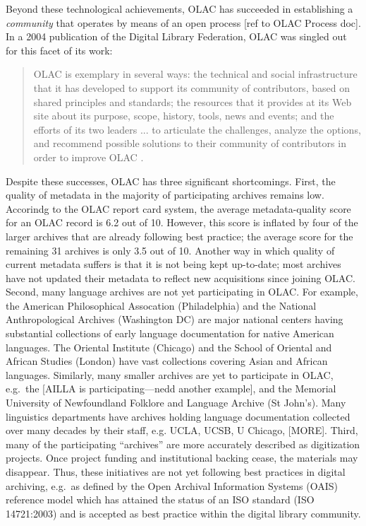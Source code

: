Beyond these technological achievements, OLAC has succeeded in
establishing a \emph{community} that operates by means of an open
process [ref to OLAC Process doc].  In a 2004 publication of the
Digital Library Federation, OLAC was singled out for this
facet of its work:

\begin{quote} \small
  OLAC is exemplary in several ways: the technical and social
  infrastructure that it has developed to support its community of
  contributors, based on shared principles and standards; the
  resources that it provides at its Web site about its purpose, scope,
  history, tools, news and events; and the efforts of its two leaders
  ... to articulate the challenges, analyze the options, and recommend
  possible solutions to their community of contributors in order to
  improve OLAC \citep{Brogan04}.
\end{quote}


Despite these successes, OLAC has three significant shortcomings.
First, the quality of metadata in the majority of participating archives remains
low.  Accorindg to the OLAC report card system, the average 
metadata-quality score for an OLAC record is 6.2 out of 10. However,
this score is
inflated by four of the larger archives that are already
following best practice; the average score for the remaining 31 archives
is only 3.5 out of 10.  Another way in which quality of current metadata suffers is that it is not being kept up-to-date; most archives have not
updated their metadata to reflect new acquisitions since joining OLAC.
Second, many language archives are not yet participating in OLAC.  For
example, the American Philosophical Assocation (Philadelphia) and the
National Anthropological Archives (Washington DC) are major national
centers having substantial collections of early language documentation
for native American languages.  The Oriental Institute (Chicago) and
the School of Oriental and African Studies (London) have vast
collections covering Asian and African languages.  Similarly, many
smaller archives are yet to participate in OLAC, e.g.\ the
[AILLA is participating---nedd another example], and the
Memorial University of Newfoundland Folklore and Language Archive (St
John's).  Many linguistics departments have archives holding language
documentation collected over many decades by their staff, e.g. UCLA,
UCSB, U Chicago, [MORE].
Third, many of the participating ``archives'' are more accurately described
as digitization projects.  Once project funding and institutional
backing cease, the materials may disappear.  Thus, these
initiatives are not yet following best practices in digital archiving,
e.g.\ as defined by the Open Archival Information Systems (OAIS) reference model \citep{OAIS02} which has attained the status of an ISO standard (ISO 14721:2003) and is accepted as best practice within the digital library community.

